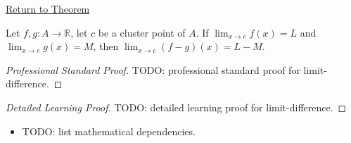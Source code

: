 \newpage
{}
\label{prf:limit-difference}

\begin{remark*}[Return]
\hyperref[thm:limit-difference]{Return to Theorem}
\end{remark*}

\begin{theorem*}
Let $f, g : A \to \mathbb{R}$, let $c$ be a cluster point of $A$. If
$\lim_{x\to c}f(x)=L$ and $\lim_{x\to c}g(x)=M$, then
$\lim_{x\to c}(f-g)(x) = L-M$.
\end{theorem*}

\begin{proof}[Professional Standard Proof]
\LRAProofBodyStart
TODO: professional standard proof for limit-difference.
\end{proof}

\begin{proof}[Detailed Learning Proof]
\LRAProofBodyStart
TODO: detailed learning proof for limit-difference.
\end{proof}

\begin{remark*}
\end{remark*}

\begin{dependencies}
\begin{itemize}
  \item TODO: list mathematical dependencies.
\end{itemize}
\end{dependencies}

\clearpage
